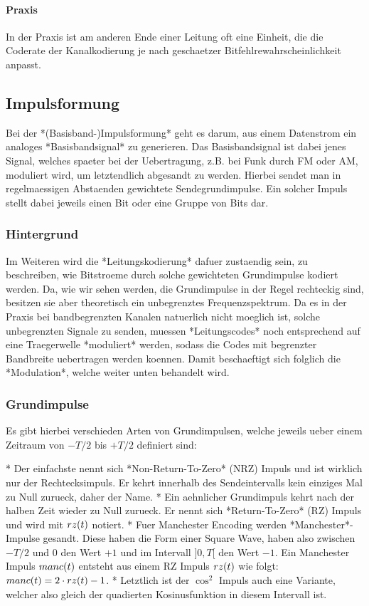 \paragraph{ Praxis}

In der Praxis ist am anderen Ende einer Leitung oft eine Einheit, die die
Coderate der Kanalkodierung je nach geschaetzer Bitfehlrewahrscheinlichkeit
anpasst.

\subsection{ Impulsformung}

Bei der *(Basisband-)Impulsformung* geht es darum, aus einem Datenstrom ein
analoges *Basisbandsignal* zu generieren. Das Basisbandsignal ist dabei jenes
Signal, welches spaeter bei der Uebertragung, z.B. bei Funk durch FM oder AM,
moduliert wird, um letztendlich abgesandt zu werden. Hierbei sendet man in
regelmaessigen Abstaenden gewichtete Sendegrundimpulse. Ein solcher Impuls
stellt dabei jeweils einen Bit oder eine Gruppe von Bits dar.

\subsubsection{ Hintergrund}

Im Weiteren wird die *Leitungskodierung* dafuer zustaendig sein, zu beschreiben,
wie Bitstroeme durch solche gewichteten Grundimpulse kodiert werden. Da, wie wir
sehen werden, die Grundimpulse in der Regel rechteckig sind, besitzen sie aber
theoretisch ein unbegrenztes Frequenzspektrum. Da es in der Praxis bei
bandbegrenzten Kanalen natuerlich nicht moeglich ist, solche unbegrenzten
Signale zu senden, muessen *Leitungscodes* noch entsprechend auf eine
Traegerwelle *moduliert* werden, sodass die Codes mit begrenzter Bandbreite
uebertragen werden koennen. Damit beschaeftigt sich folglich die *Modulation*,
welche weiter unten behandelt wird.

\subsubsection{ Grundimpulse}

Es gibt hierbei verschieden Arten von Grundimpulsen, welche jeweils ueber einem
Zeitraum von $-T/2$ bis $+T/2$ definiert sind:

* Der einfachste nennt sich *Non-Return-To-Zero* (NRZ) Impuls und ist wirklich
  nur der Rechtecksimpuls. Er kehrt innerhalb des Sendeintervalls kein einziges
  Mal zu Null zurueck, daher der Name.
* Ein aehnlicher Grundimpuls kehrt nach der halben Zeit wieder zu Null
  zurueck. Er nennt sich *Return-To-Zero* (RZ) Impuls und wird mit $\mathop{rz}(t)$ notiert.
* Fuer Manchester Encoding werden *Manchester*-Impulse gesandt. Diese haben die
  Form einer Square Wave, haben also zwischen $-T/2$ und $0$ den Wert $+1$ und
  im Intervall $]0, T[$ den Wert $-1$. Ein Manchester Impuls $\mathop{manc}(t)$ entsteht
  aus einem RZ Impuls $\mathop{rz}(t)$ wie folgt: $\mathop{manc}(t) = 2\cdot \mathop{rz}(t) - 1$.
* Letztlich ist der $\cos^2$ Impuls auch eine Variante, welcher also gleich der
  quadierten Kosinusfunktion in diesem Intervall ist.

